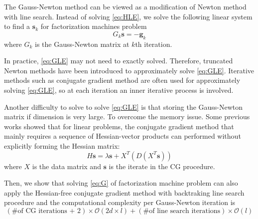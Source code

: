 \documentclass[11pt,twoside]{article}
\newcommand{\bsym}[1]{\ensuremath{\boldsymbol{#1}}}
\newcommand{\bs}{\ensuremath{\bsym{s}}}
\newcommand{\bg}{\ensuremath{\bsym{g}}}
\newcommand{\bbO}[1]{\ensuremath{\mathcal{O}\left(#1\right)}}
\begin{document}
The Gauss-Newton method can be viewed as a modification of Newton method with line search. Instead of solving \eqref{eq:HLE}, we solve the following linear system to find a $\bs_k$ for factorization machines problem
\begin{equation}
	G_k\bs = -\bg_k
\label{eq:GLE}
\end{equation}
where $G_k$ is the Gauss-Newton matrix at $k$th iteration.


In practice, \eqref{eq:GLE} may not need to exactly solved. Therefore, truncated Newton methods have been introduced to approximately solve \eqref{eq:GLE}. Iterative methods such as conjugate gradient method are often used for approximately solving \eqref{eq:GLE}, so at each iteration an inner iterative process is involved.

Another difficulty to solve to solve \eqref{eq:GLE} is that storing the Gauss-Newton matrix if dimension is very large. To overcome the memory issue. Some previous works showed that for linear problems, the conjugate gradient method that mainly requires a sequence of Hessian-vector products can performed without explicitly forming the Hessian matrix:
\begin{equation}
    H\bs = \lambda\bs + X^T(D(X^T\bs))
\label{eq:Hv}
\end{equation}
where $X$ is the data matrix and $\bs$ is the iterate in the CG procedure.

Then, we show that solving \eqref{eq:G} of factorization machine problem can also apply the Hessian-free conjugate gradient method with backtraking line search procedure and the computational complexity per Gauss-Newton iteration is 
\begin{equation*}
(\text{\# of CG iterations + 2}) \times \bbO{2d \times l} + (\text{\# of line search iterations})\times \bbO{l}
\end{equation*}
\end{document}
